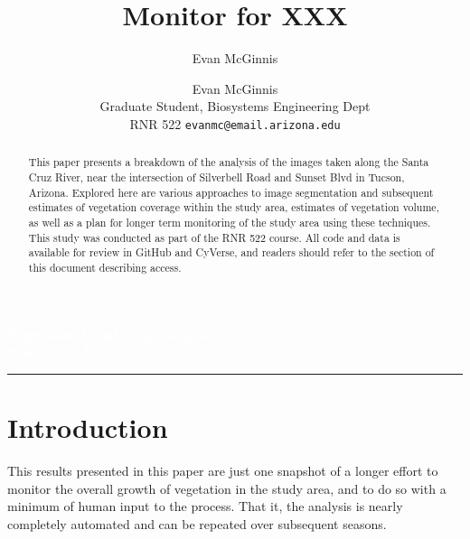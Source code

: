 \documentclass[letterpaper]{article}
\author{Evan McGinnis}
\title{Monitor for XXX}
\author{%
    Evan McGinnis \\
    Graduate Student, Biosystems Engineering Dept \\
    RNR 522
    \texttt{evanmc@email.arizona.edu}\vspace{40pt} \\
    }
\makeatletter
\def\printauthor{%
    {\large \@author}}
\makeatother
\begin{document}
\begin{titlepage}
\BgThispage
{}
\vspace*{1cm}
\noindent
\textcolor{white}{\Huge\textbf{\textsf{Vegetation Monitoring along the\\ Santa Cruz River}}}
\vspace*{2.5cm}\par
\noindent
\begin{minipage}{0.35\linewidth}
    \begin{flushright}
        \printauthor
    \end{flushright}
\end{minipage} \hspace{15pt}
%
\begin{minipage}{0.02\linewidth}
    \rule{1pt}{175pt}
\end{minipage} \hspace{-10pt}
%
\begin{minipage}{0.6\linewidth}
\vspace{5pt}
    \begin{abstract} 
This paper presents a breakdown of the analysis of the images taken along the Santa Cruz River, near the intersection of Silverbell Road and Sunset Blvd in Tucson, Arizona. Explored here are various approaches to image segmentation and subsequent estimates of vegetation coverage within the study area, estimates of vegetation volume, as well as a plan for longer term monitoring of the study area using these techniques. This study was conducted as part of the RNR 522 course. All code and data is available for review in GitHub and CyVerse, and readers should refer to the section of this document describing access.
    \end{abstract}
\end{minipage}
\end{titlepage}
\restoregeometry
%
%
\section{Introduction}
This results presented in this paper are just one snapshot of a longer effort to monitor the overall growth of vegetation in the study area, and to do so with a minimum of human input to the process. That it, the analysis is nearly completely automated and can be repeated over subsequent seasons.

%
%
\end{document}
